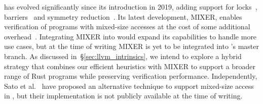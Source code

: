 \genmc{} has evolved significantly since its introduction in 2019, adding
support for locks~\cite{lock_handling_Kokologiannakis19}, 
barriers~\cite{barrier_aware_model_checking_Kokologiannakis21} and symmetry 
reduction~\cite{SPORE_2024_Kokologiannakis}.
Its latest development, MIXER, enables verification of programs with
mixed-size accesses at the cost of some additional
overhead~\cite{kokolgiannakis_mixed_size}. Integrating MIXER into
\rustmc would expand its capabilities to handle more use cases, but 
at the time of writing MIXER is yet to be integrated into \genmc's master
branch. As discussed in~\S\ref{sec:llvm_intrinsics}, we intend to
explore a hybrid strategy that combines our efficient heuristics with MIXER to
support a broader range of Rust programs while preserving verification
performance.
Independently, Sato et al.~\cite{SatoMKT24} have proposed an
alternative technique to support mixed-size access in \genmc, but
their implementation is not publicly available at the time of writing.